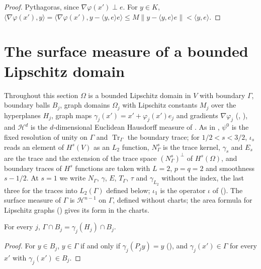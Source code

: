 \begin{proof}
\leanok
Pythagoras, since $\nabla\varphi(x') \perp e$. For $y \in K$,
$\langle \nabla\varphi(x'), y \rangle
= \langle \nabla\varphi(x'), y - \langle y, e \rangle e \rangle
\leq M \|y - \langle y, e \rangle e\| < \langle y, e \rangle$.
\end{proof}

\section{The surface measure of a bounded Lipschitz domain}
\label{sec:surface-measure}

Throughout this section $\Omega$ is a bounded Lipschitz domain in $V$ with boundary $\Gamma$,
boundary balls $B_j$, graph domains $\Omega_j$ with Lipschitz constants $M_j$ over the
hyperplanes $H_j$, graph maps $\gamma_j(x') = x' + \varphi_j(x') e_j$ and gradients
$\nabla\varphi_j$ (, ), and $\mathcal H^d$
is the $d$-dimensional Euclidean Hausdorff measure of . As in
, $\psi^0$ is the fixed resolution of unity on $\Gamma$ and
$\operatorname{Tr}_\Gamma$ the boundary trace; for $1/2 < s < 3/2$, $\iota_s$ reads an element of
$H^s(V)$ as an $L_2$ function, $N^s_\Gamma$ is the trace kernel, $\gamma_s$ and $E_s$ are the
trace and the extension of the trace space $(N^s_\Gamma)^\perp$ of $H^s(\Omega)$, and boundary
traces of $H^s$ functions are taken with $L = 2$, $p = q = 2$ and smoothness $s - 1/2$. At
$s = 1$ we write $N_\Gamma$, $\gamma$, $E$, $T_\Gamma$, $\tau$ and $\gamma_{L_2}$ without the
index, the last three for the traces into $L_2(\Gamma)$ defined below; $\iota_1$ is the operator
$\iota$ of  (). The surface measure of
$\Gamma$ is $\mathcal H^{n-1}$ on $\Gamma$, defined without charts; the area formula for
Lipschitz graphs () gives its form in the charts.

\begin{lemma}
\label{lem:boundary-ball-graph}
\leanok
{}
For every $j$, $\Gamma \cap B_j = \gamma_j(H_j) \cap B_j$.
\end{lemma}

\begin{proof}
\leanok
For $y \in B_j$, $y \in \Gamma$ if and only if $\gamma_j(P_j y) = y$ (),
and $\gamma_j(x') \in \Gamma$ for every $x'$ with $\gamma_j(x') \in B_j$.
\end{proof}

